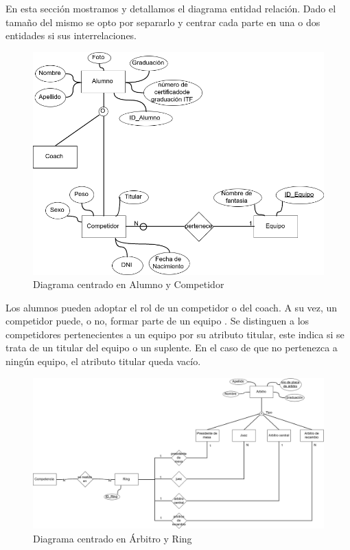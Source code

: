 En esta sección mostramos y detallamos el diagrama entidad relación. Dado el tamaño del mismo se opto por separarlo y
centrar cada parte en una o dos entidades si sus interrelaciones.

\begin{figure}[H]
  \centering
    \includegraphics[scale=0.5]{imagenes/AlumnoCompetidor.png}
  \caption{Diagrama centrado en Alumno y Competidor}
\end{figure}

Los alumnos pueden adoptar el rol de un competidor o del coach. A su vez, un competidor puede, o no, formar parte de un equipo
. Se distinguen a los competidores pertenecientes a un equipo por su atributo titular, este indica si se trata de un titular
del equipo o un suplente. En el caso de que no pertenezca a ningún equipo, el atributo titular queda vacío.

\begin{figure}[H]
  \centering
    \includegraphics[scale=0.3]{imagenes/ArbitroRing.png}
  \caption{Diagrama centrado en Árbitro y Ring}
\end{figure}

